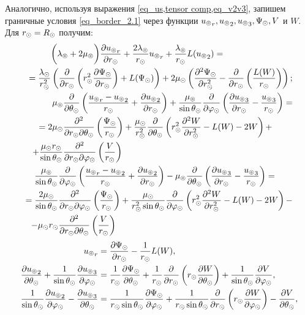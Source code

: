 Аналогично, используя выражения \cref{eq_us,tensor comp,eq_v2v3}, запишем граничные условия \cref{eq_border_2.1} через функции ${u\l}_r, {u\l}_2, {u\l}_3, \P\s, V$ и $W.$ Для $r\s = R\s$ получим:
\begin{align}
\begin{split}
&\biggl(\la\l+2\mu\l\biggr)\fr{\de {u\l}_r}{\de r\s} + \fr{2\la\l}{r\s}{u\l}_r + \fr{\la\l}{r\s}L({u\l}_2) = \\
= \fr{\la\s}{r\s^2}&\left(\fr{\de}{\de r\s}\left(r\s^2\fr{\de\P\s}{\de r\s}\right)+L(\P\s)\right) + 2\mu\s\left(\fr{\de^2 \P\s}{\de r\s^2} - \fr{\de}{\de r\s}\left(\fr{L(W)}{r\s}\right)\right);
\end{split}\\
\begin{split}
\mu\l&\fr{\de}{\de \Q\s}\left(\fr{{u\l}_r-{u\l}_2}{r\s} + \fr{\de {u\l}_2}{\de r\s}\right) + \fr{\mu\l}{\sin\Q\s}\fr{\de}{\de \f\s}\left(\fr{\de {u\l}_3}{\de r\s} - \fr{{u\l}_3}{r\s}\right) = \\
= 2\mu\s&\fr{\de^2}{\de r\s\de\Q\s}\left(\fr{\P\s}{r\s}\right)+ \fr{\mu\s}{r\s^2}\fr{\de}{\de\Q\s}\left(r\s^2\fr{\de^2 W}{\de r\s^2} - L(W) - 2W\right) + \\
+ \fr{\mu\s r\s}{\sin\Q\s}&\fr{\de^2}{\de r\s\de\f\s}\left(\fr{V}{r\s}\right)
\end{split}\\
\begin{split}
\fr{\mu\l}{\sin\Q\s}&\fr{\de}{\de \f\s}\left(\fr{{u\l}_r-{u\l}_2}{r\s} + \fr{\de {u\l}_2}{\de r\s}\right) - \mu\l\fr{\de}{\de \Q\s}\left(\fr{\de {u\l}_3}{\de r\s} - \fr{{u\l}_3}{r\s}\right) = \\
= \fr{2\mu\s}{\sin\Q\s}&\fr{\de^2}{\de r\s\de\f\s}\left(\fr{\P\s}{r\s}\right)+ \fr{\mu\s}{r\s^2\sin\Q\s}\fr{\de}{\de\f\s}\left(r\s^2\fr{\de^2 W}{\de r\s^2} - L(W) - 2W\right) - \\
- \mu\s r\s&\fr{\de^2}{\de r\s\de\Q\s}\left(\fr{V}{r\s}\right)
\end{split}
\end{align}
\begin{align}
{u\l}_r &= \fr{\de \P\s}{\de r\s} - \fr{1}{r\s}L(W),\\
\df{\de {u\l}_2}{\de\Q\s} + \fr1{\sin\Q\s}\fr{\de {u\l}_3}{\de\f\s} &= \fr{1}{r\s}\fr{\de \P\s}{\de \Q\s} + \fr{1}{r\s}\fr{\de}{\de r\s}\left(r\s\fr{\de W}{\de \Q\s}\right) + \fr{1}{\sin\Q\s}\fr{\de V}{\de\f\s},\\
\df1{\sin\Q\s}\df{\de {u\l}_2}{\de\f\s} - \df{\de {u\l}_3}{\de\Q\s} &= \fr{1}{r\s \sin\Q\s}\fr{\de \P\s}{\de \f\s} + \fr{1}{r\s\sin\Q\s}\fr{\de}{\de r\s}\left(r\s\fr{\de W}{\de \f\s}\right) - \fr{\de V}{\de \Q\s},
\end{align}

